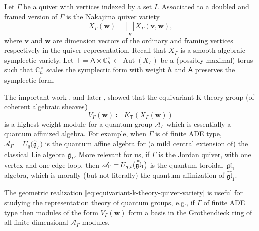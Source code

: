 \documentclass[pdftex]{sigma}%
\numberwithin{equation}{section}
\renewcommand{\hat}[1]{\widehat{#1}}
\newcommand{\hhat}[1]{\hat{\vphantom{\rule{1pt}{5.5pt}}\smash{\hat{#1}}}}
\renewcommand{\vec}[1]{\bm{#1}}
\newcommand{\cat}[1]{\mathsf{#1}}
\newcommand{\lie}[1]{\mathfrak{#1}}
\newcommand{\bC}{\mathbb{C}}
\newcommand{\sA}{\mathsf{A}}
\newcommand{\sT}{\mathsf{T}}
\newcommand{\scA}{\mathscr{A}}
\DeclareMathOperator{\Aut}{Aut}
\begin{document}
\begin{MyParagraph}\label{sec:geometric-realization-modules}
Let $\Gamma$ be a quiver with vertices indexed by a set $I$.
Associated to a doubled and framed version of $\Gamma$ is the Nakajima
quiver variety
\[ X_\Gamma(\vec w) = \bigsqcup_{\vec v} X_\Gamma(\vec v, \vec w), \]
where $\vec v$ and $\vec w$ are dimension vectors of the ordinary and
framing vertices respectively in the quiver representation. Recall
that $X_\Gamma$ is a smooth algebraic symplectic variety. Let
$\sT = \sA \times \bC_{\hbar}^\times \subset \Aut(X_\Gamma)$ be a
(possibly maximal) torus such that $\bC_{\hbar}^\times$ scales the
symplectic form with weight $\hbar$ and $\sA$ preserves the symplectic
form.

The important work \cite{Nakajima2001}, and later \cite{Maulik2019,
 Okounkov2016}, showed that the equivariant K-theory group (of
coherent algebraic sheaves)
\begin{equation} \label{eq:equivariant-k-theory-quiver-variety}
 V_\Gamma(\vec w) \coloneqq K_\sT(X_\Gamma(\vec w)) %
\end{equation}
is a highest-weight module for a quantum group $\scA_\Gamma$ which is
essentially a quantum affinized algebra. For example, when $\Gamma$ is
of finite ADE type, $\scA_\Gamma = U_q\big(\hat{\lie{g}}_\Gamma\big)$ is the
quantum affine algebra for (a mild central extension of) the classical
Lie algebra $\lie{g}_\Gamma$. More relevant for us, if $\Gamma$ is the
Jordan quiver, with one vertex and one edge loop, then
$\scA_\Gamma = U_{q,t}\big(\hhat{\lie{gl}}_1\big)$ is the quantum toroidal~$\lie{gl}_1$ algebra, which is morally (but not literally) the quantum
affinization of $\hat{\lie{gl}}_1$.

The geometric realization
\eqref{eq:equivariant-k-theory-quiver-variety} is useful for studying
the representation theory of quantum groups, e.g., if $\Gamma$ of finite ADE
type then modules of the form $V_\Gamma(\vec w)$ form a basis in the
Grothendieck ring of all finite-dimensional $\scA_\Gamma$-modules.
\end{MyParagraph}
\end{document}
